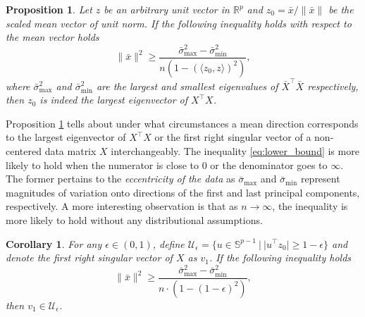 \documentclass[11pt]{article}
\newtheorem{proposition}[theorem]{Proposition}
\newtheorem{corollary}[theorem]{Corollary}
\newcommand{\calU}{\mathcal{U}}
\newcommand{\bbR}{\mathbb{R}}
\newcommand{\bbS}{\mathbb{S}}
\begin{document}
\vspace{0.25cm}
\begin{tcolorbox}[colback=GreenYellow]
	\begin{proposition}\label{theory:shape1}
		Let $z$ be an arbitrary unit vector in $\bbR^p$ and $z_0 = \bar{x}/\|\bar{x}\|$ be the scaled mean vector of unit norm. If the following inequality holds  with respect to the mean vector holds
		\begin{equation}\label{eq:lower_bound}
			\|\bar{x}\|^2 \geq \frac{\bar{\sigma}_{\max}^2-\bar{\sigma}_{\min}^2}{n(1-(\langle z_0, z\rangle)^2)},
		\end{equation}
		where $\bar{\sigma}_{\max}^2$ and $\bar{\sigma}_{\min}^2$ are the largest and smallest eigenvalues of $\bar{X}^\top \bar{X}$ respectively, then $z_0$ is indeed the largest eigenvector of $X^\top X$. 
	\end{proposition}
\end{tcolorbox}
\vspace{0.25cm}





Proposition \ref{theory:shape1} tells about under what circumstances a mean direction corresponds to the largest eigenvector of $X^\top X$ or the first right singular vector of a non-centered data matrix $X$ interchangeably. The inequality \eqref{eq:lower_bound} is more likely to hold when the numerator is close to 0 or the denominator goes to $\infty$. The former pertains to the \emph{eccentricity of the data} as $\bar{\sigma}_{\max}$ and $\bar{\sigma}_{\min}$ represent magnitudes of variation onto directions of the first and last principal components, respectively. A more interesting observation is that as $n \rightarrow \infty$, the inequality is more likely to hold without any distributional assumptions. 




\vspace{0.25cm}
\begin{tcolorbox}[colback=GreenYellow]
\begin{corollary}\label{theory:shape2}
	For any $\epsilon \in (0,1)$, define $\calU_{\epsilon} = \lbrace u \in \bbS^{p-1}~|~ |u^\top z_0| \geq 1-\epsilon\rbrace $ and denote the first right singular vector of $X$ as $v_1$. If the following inequality holds
	\begin{equation*}
		\|\bar{x}\|^2 \geq \frac{\bar{\sigma}_{\max}^2 - \bar{\sigma}_{\min}^2}{n\cdot \left(1 - (1-\epsilon)^2\right)},
	\end{equation*}
	then $v_1 \in \calU_{\epsilon}$. 
\end{corollary}
\end{tcolorbox}
\vspace{0.25cm}
\end{document}
